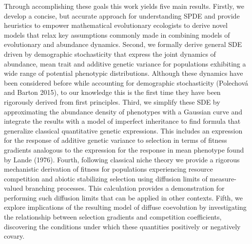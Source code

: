 \documentclass[]{article}
\begin{document}
Through accomplishing these goals this work yields five main results.
Firstly, we develop a concise, but accurate approach for understanding
SPDE and provide heuristics to empower mathematical evolutionary
ecologists to derive novel models that relax key assumptions commonly
made in combining models of evolutionary and abundance dynamics. Second,
we formally derive general SDE driven by demographic stochasticity that
express the joint dynamics of abundance, mean trait and additive genetic
variance for populations exhibiting a wide range of potential phenotypic
distributions. Although these dynamics have been considered before while
accounting for demographic stochasticity (Polechová and Barton 2015), to
our knowledge this is the first time they have been rigorously derived
from first principles. Third, we simplify these SDE by approximating the
abundance density of phenotypes with a Gaussian curve and integrate the
results with a model of imperfect inheritance to find formula that
generalize classical quantitative genetic expressions. This includes an
expression for the response of additive genetic variance to selection in
terms of fitness gradients analogous to the expression for the response
in mean phenotype found by Lande (1976). Fourth, following classical
niche theory we provide a rigorous mechanistic derivation of fitness for
populations experiencing resource competition and abiotic stabilizing
selection using diffusion limits of measure-valued branching processes.
This calculation provides a demonstration for performing such diffusion
limits that can be applied in other contexts. Fifth, we explore
implications of the resulting model of diffuse coevolution by
investigating the relationship between selection gradients and
competition coefficients, discovering the conditions under which these
quantities positively or negatively covary.
\end{document}
